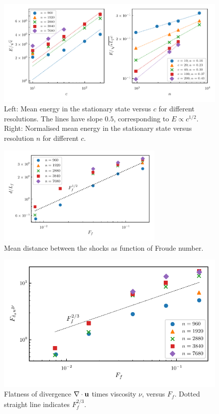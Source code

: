 \documentclass{jfm}
\begin{document}
\begin{figure}
\centerline{\includegraphics[width=5.8in]{../Pyfig/fig_energy_lap}}
\caption{Left: Mean energy in the stationary state versus $ c $ for different
resolutions. The lines have slope $ 0.5 $, corresponding to $ E \propto c^{1/2}
$. Right: Normalised mean energy in the stationary state versus resolution $ n
$ for different $ c $.}
\label{MeanE2}
\end{figure}

\begin{figure}
\centerline{\includegraphics[width=8cm]{../Pyfig/fig_shock_sep_lap.pdf}}
\caption{Mean distance between the shocks as function of Froude number.  }
\label{fig_distance_lap}
\end{figure}


\begin{figure}
\centerline{\includegraphics[width= 8cmin]{../Pyfig/fig_flatness_div_norm_nu.pdf}}
\caption{Flatness of divergence $ \nabla \cdot {\bf u} $ times viscosity $ \nu $, versus $ F_f $. Dotted straight line indicates $ F_f^{2/3} $. }
\label{FlatnessDiv}
\end{figure}
\end{document}

